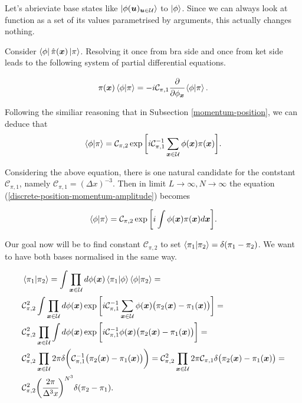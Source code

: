 \documentclass[main.tex]{subfiles}
\begin{document}
Let's abrieviate base states like $\ket{\phi(\boldsymbol{u})_{\boldsymbol{u}\in \mathcal{U}}}$ to $\ket{\phi}$. Since we can always look at function as a set of its values parametrised by arguments, this actually changes nothing.

Consider $\bra{\phi}\hat{\pi}(\boldsymbol{x})\ket{\pi}$. Resolving it once from bra side and once from ket side leads to the following system of partial differential equations.

\begin{equation}
\pi(\boldsymbol{x}) \bra{\phi}\ket{\pi} = -i \mathcal{C}_{\pi,1}
\cfrac{\partial}{\partial \phi_{\boldsymbol{x}}} \bra{\phi}\ket{\pi}.
\end{equation}

Following the similiar reasoning that in Subsection \ref{momentum-position}, we can deduce that
\begin{equation}
\label{discrete-position-momentum-amplitude}
\bra{\phi}\ket{\pi} = \mathcal{C}_{\pi,2}
\exp\bigg[ i \mathcal{C}^{-1}_{\pi, 1} \sum_{\boldsymbol{x}\in\mathcal{U}} \phi(\boldsymbol{x})\pi(\boldsymbol{x})\bigg].
\end{equation}

Considering the above equation, there is one natural candidate for the contstant $\mathcal{C}_{\pi, 1}$, namely $\mathcal{C}_{\pi, 1} = (\Delta x)^{-3}$. 
Then in limit $L\to \infty, N\to \infty$ the equation (\ref{discrete-position-momentum-amplitude}) becomes

\begin{equation}
\bra{\phi}\ket{\pi} = \mathcal{C}_{\pi,2}
\exp\bigg[ i \int  \phi(\boldsymbol{x})\pi(\boldsymbol{x})d\boldsymbol{x}\bigg].
\end{equation}

Our goal now will be to find constant $\mathcal{C}_{\pi, 2}$ to set $\bra{\pi_1}\ket{\pi_2} = \delta(\pi_1 - \pi_2)$. We want to have both bases normalised in the same way.

\begin{align*}
& \bra{\pi_1}\ket{\pi_2} = \int \prod_{\boldsymbol{x}\in \mathcal{U}} d\phi(\boldsymbol{x}) \bra{\pi_1}\ket{\phi}\bra{\phi}\ket{\pi_2} = \\
& \mathcal{C}^2_{\pi,2}\int \prod_{\boldsymbol{x}\in \mathcal{U}} d\phi(\boldsymbol{x}) 
\exp\bigg[i \mathcal{C}^{-1}_{\pi, 1}\sum_{\boldsymbol{x}\in\mathcal{U}} \phi(\boldsymbol{x})\big(\pi_2(\boldsymbol{x})
- \pi_1(\boldsymbol{x})\big)\bigg] = \\
& \mathcal{C}^2_{\pi,2} \prod_{\boldsymbol{x}\in \mathcal{U}} \int d\phi(\boldsymbol{x}) 
\exp\bigg[ i \mathcal{C}^{-1}_{\pi, 1} \phi(\boldsymbol{x})\big(\pi_2(\boldsymbol{x})
- \pi_1(\boldsymbol{x})\big)\bigg] = \\
& \mathcal{C}^2_{\pi,2} \prod_{\boldsymbol{x}\in \mathcal{U}} 2\pi
\delta\bigg(\mathcal{C}^{-1}_{\pi, 1}\big(\pi_2(\boldsymbol{x}) 
- \pi_1(\boldsymbol{x})\big)\bigg) = 
\mathcal{C}^2_{\pi,2} \prod_{\boldsymbol{x}\in \mathcal{U}} 2\pi\mathcal{C}_{\pi, 1}
\delta\big(\pi_2(\boldsymbol{x}) - \pi_1(\boldsymbol{x})\big) = \\
& \mathcal{C}^2_{\pi,2}\bigg(\cfrac{2\pi}{\Delta^3 x} \bigg)^{N^3} \delta(\pi_2 - \pi_1).
\end{align*}
\end{document}
